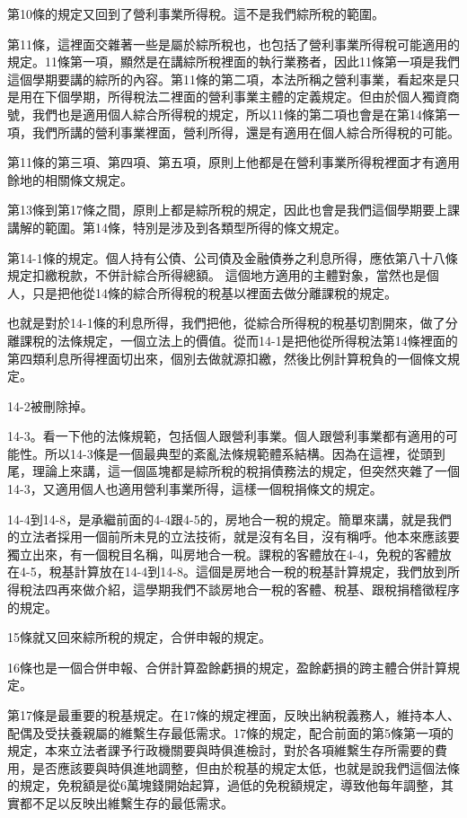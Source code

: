 \documentclass[]{ctexbook}
\begin{document}
第10條的規定又回到了營利事業所得稅。這不是我們綜所稅的範圍。

第11條，這裡面交雜著一些是屬於綜所稅也，也包括了營利事業所得稅可能適用的規定。11條第一項，顯然是在講綜所稅裡面的執行業務者，因此11條第一項是我們這個學期要講的綜所的內容。第11條的第二項，本法所稱之營利事業，看起來是只是用在下個學期，所得稅法二裡面的營利事業主體的定義規定。但由於個人獨資商號，我們也是適用個人綜合所得稅的規定，所以11條的第二項也會是在第14條第一項，我們所講的營利事業裡面，營利所得，還是有適用在個人綜合所得稅的可能。

第11條的第三項、第四項、第五項，原則上他都是在營利事業所得稅裡面才有適用餘地的相關條文規定。

第13條到第17條之間，原則上都是綜所稅的規定，因此也會是我們這個學期要上課講解的範圍。第14條，特別是涉及到各類型所得的條文規定。

第14-1條的規定。個人持有公債、公司債及金融債券之利息所得，應依第八十八條規定扣繳稅款，不併計綜合所得總額。
這個地方適用的主體對象，當然也是個人，只是把他從14條的綜合所得稅的稅基以裡面去做分離課稅的規定。

也就是對於14-1條的利息所得，我們把他，從綜合所得稅的稅基切割開來，做了分離課稅的法條規定，一個立法上的價值。從而14-1是把他從所得稅法第14條裡面的第四類利息所得裡面切出來，個別去做就源扣繳，然後比例計算稅負的一個條文規定。

14-2被刪除掉。

14-3。看一下他的法條規範，包括個人跟營利事業。個人跟營利事業都有適用的可能性。所以14-3條是一個最典型的紊亂法條規範體系結構。因為在這裡，從頭到尾，理論上來講，這一個區塊都是綜所稅的稅捐債務法的規定，但突然夾雜了一個14-3，又適用個人也適用營利事業所得，這樣一個稅捐條文的規定。

14-4到14-8，是承繼前面的4-4跟4-5的，房地合一稅的規定。簡單來講，就是我們的立法者採用一個前所未見的立法技術，就是沒有名目，沒有稱呼。他本來應該要獨立出來，有一個稅目名稱，叫房地合一稅。課稅的客體放在4-4，免稅的客體放在4-5，稅基計算放在14-4到14-8。這個是房地合一稅的稅基計算規定，我們放到所得稅法四再來做介紹，這學期我們不談房地合一稅的客體、稅基、跟稅捐稽徵程序的規定。

15條就又回來綜所稅的規定，合併申報的規定。

16條也是一個合併申報、合併計算盈餘虧損的規定，盈餘虧損的跨主體合併計算規定。

第17條是最重要的稅基規定。在17條的規定裡面，反映出納稅義務人，維持本人、配偶及受扶養親屬的維繫生存最低需求。17條的規定，配合前面的第5條第一項的規定，本來立法者課予行政機關要與時俱進檢討，對於各項維繫生存所需要的費用，是否應該要與時俱進地調整，但由於稅基的規定太低，也就是說我們這個法條的規定，免稅額是從6萬塊錢開始起算，過低的免稅額規定，導致他每年調整，其實都不足以反映出維繫生存的最低需求。
\end{document}
